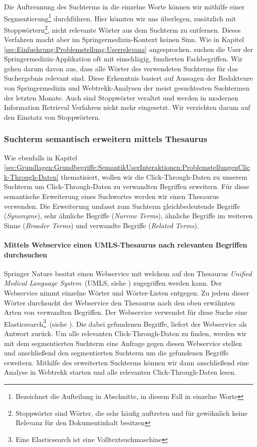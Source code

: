 Die Auftrennung des Suchterms in die einzelne Worte können wir mithilfe einer Segmentierung\footnote{Bezeichnet die Aufteilung in Abschnitte, in diesem Fall in einzelne Worte} durchführen. Hier könnten wir uns überlegen, zusätzlich mit Stoppwörtern\footnote{Stoppwörter sind Wörter, die sehr häufig auftreten und für gewöhnlich keine Relevanz für den Dokumentinhalt besitzen}, nicht relevante Wörter aus dem Suchterm zu entfernen. Dieses Verfahren macht aber im Springermedizin-Kontext keinen Sinn. Wie in Kapitel \ref{sec:Einfuehrung:Problemstellung:Userrelevanz} angesprochen, suchen die User der Springermedizin-Applikation oft mit einschlägig, fundierten Fachbegriffen. Wir gehen darum davon aus, dass alle Wörter des verwendeten Suchterms für das Suchergebnis relevant sind. Diese Erkenntnis basiert auf Aussagen der Redakteure von Springermedizin und Webtrekk-Analysen der meist gesuchtesten Suchtermen der letzten Monate. Auch sind Stoppwörter veraltet und werden in modernen Information Retrieval Verfahren nicht mehr eingesetzt. Wir verzichten darum auf den Einstatz von Stoppwörtern.

\subsubsection{Suchterm semantisch erweitern mittels Thesaurus}
\label{sec:Reranking:Methodik:SuchtermSegmentierung:SuchtermThesaurus}

Wie ebenfalls in Kapitel \ref{sec:Grundlagen:Grundbegriffe:SemantikUserInteraktionen:ProblemstellungenClick-Through-Daten} thematisiert, wollen wir die Click-Through-Daten zu unserem Suchterm um Click-Through-Daten zu verwandten Begriffen erweitern. Für diese semantische Erweiterung eines Suchwortes werden wir einen Thesaurus verwenden. Die Erweiterung umfasst zum Suchterm gleichbedeutende Begriffe (\textit{Synonyme}), sehr ähnliche Begriffe (\textit{Narrow Terms}), ähnliche Begriffe im weiteren Sinne (\textit{Broader Terms}) und verwandte Begriffe (\textit{Related Terms}). 

\paragraph{Mittels Webservice einen UMLS-Thesaurus nach relevanten Begriffen durchsuchen}
Springer Nature besitzt einen Webservice mit welchem auf den Thesaurus \textit{Unified Medical Language System}~(UMLS, siehe \cite{UMLS}) zugegriffen werden kann. Der Webservice nimmt einzelne Wörter und Wörter-Listen entgegen. Zu jedem dieser Wörter durchsucht der Webservice den Thesaurus nach den oben erwähnten Arten von verwandten Begriffen. Der Webservice verwendet für diese Suche eine Elasticsearch\footnote{Eine Elasticsearch ist eine Volltextsuchmaschine}~(siehe \cite{elasticsearch}). Die dabei gefundenen Begriffe, liefert der Webservice als Antwort zurück. Um alle relevanten Click-Through-Daten zu finden, werden wir mit dem segmentierten Suchterm eine Anfrage gegen diesen Webservice stellen und anschließend den segmentierten Suchterm um die gefundenen Begriffe erweitern. Mithilfe des erweiterten Suchterms können wir dann anschließend eine Analyse in Webtrekk starten und alle relevanten Click-Through-Daten lesen. 

